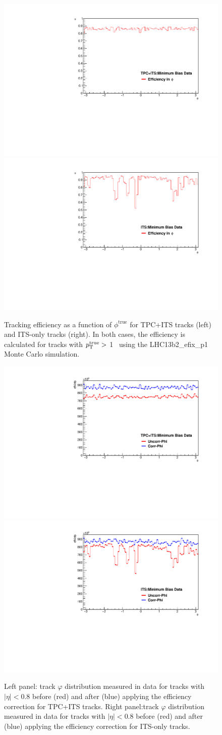 \begin{figure}[htpb]
\center
\includegraphics[width=.495\textwidth]{Data_Analysis/Tracking/tpc_phi_eff.pdf}
\includegraphics[width=.495\textwidth]{Data_Analysis/Tracking/its_phi_eff.pdf}
\caption{Tracking efficiency as a function of $\phi^{\mathrm{true}}$ for TPC+ITS tracks (left) and ITS-only tracks (right). In both cases, the efficiency is calculated for tracks with $p_{\mathrm{T}}^{\mathrm{true}}>$ 1 \GeVc~using the LHC13b2\_efix\_p1 Monte Carlo simulation.}
\label{fig:phiEff}
\end{figure}

\begin{figure}[htpb]
\center
\includegraphics[width=.495\textwidth]{Data_Analysis/Tracking/phi_efficiency_cor_tpc.pdf}
\includegraphics[width=.495\textwidth]{Data_Analysis/Tracking/phi_efficiency_cor_its.pdf}
\caption{Left panel: track $\varphi$ distribution measured in data for tracks with $|\eta|<0.8$ before (red) and after (blue) applying the efficiency correction for TPC+ITS tracks. Right panel:track $\varphi$ distribution measured in data for tracks with $|\eta|<0.8$ before (red) and after (blue) applying the efficiency correction for ITS-only tracks.}
\label{fig:phiCorr}
\end{figure}

